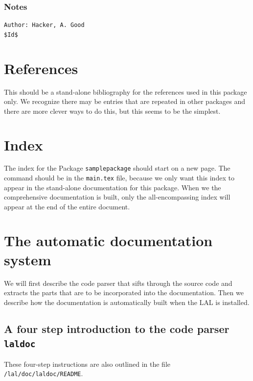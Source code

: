 \documentclass[oneside]{book}
\begin{document}
\subsection*{Notes}


\vfill{\footnotesize{
\vspace{-1ex}
\mbox{}
\vspace{-3ex}
\begin{verbatim}
Author: Hacker, A. Good
$Id$
\end{verbatim}
}}


\chapter*{References}

This should be a stand-alone bibliography for the references used in
this package only.  We recognize there may be entries that are
repeated in other packages and there are more clever ways to do this,
but this seems to be the simplest.

\chapter*{Index}
The index for the Package {\tt samplepackage} should start on a new
page.  The \verb@\printindex@ command should be in the {\tt main.tex}
file, because we only want this index to appear in the stand-alone
documentation for this package.  When we the comprehensive
documentation is built, only the all-encompassing index will appear
at the end of the entire document.

\chapter{The automatic documentation system}
\label{c:laldoc}

We will first describe the code parser that sifts through the source
code and extracts the parts that are to be incorporated into the
documentation. Then we describe how the documentation is automatically
built when the LAL is installed.

\section{A four step introduction to the code parser {\texttt {laldoc}}}

\noindent
These four-step instructions are also outlined in the file 
{\tt /lal/doc/laldoc/README}.
\end{document}
